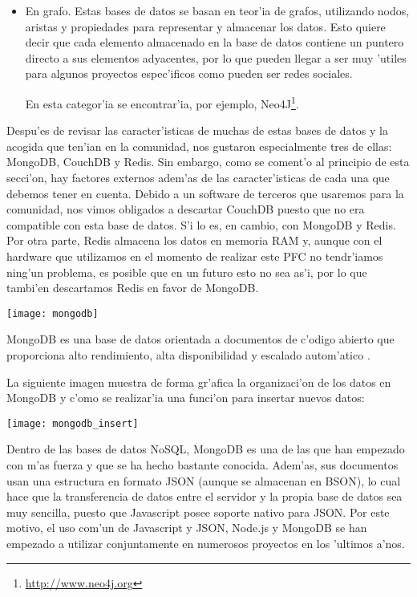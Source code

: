 \begin{itemize}
 Un ejemplo de base de datos Clave-valor es Redis\footnote{\url{http://redis.io}}.
 
 \item En grafo.
 Estas bases de datos se basan en teor'ia de grafos, utilizando nodos, aristas y propiedades para
 representar y almacenar los datos. Esto quiere decir que cada elemento almacenado en la base
 de datos contiene un puntero directo a sus elementos adyacentes, por lo que pueden llegar a
 ser muy 'utiles para algunos proyectos espec'ificos como pueden ser redes sociales.
 
 En esta categor'ia se encontrar'ia, por ejemplo, Neo4J\footnote{\url{http://www.neo4j.org}}.
 
\end{itemize}

Despu'es de revisar las caracter'isticas de muchas de estas bases de datos y la acogida que ten'ian en la
comunidad, nos gustaron especialmente tres
de ellas: MongoDB, CouchDB y Redis. Sin embargo, como se coment'o al principio de esta secci'on, hay factores
externos adem'as de las caracter'isticas de cada una que debemos tener en cuenta. Debido a un software de terceros
que usaremos para la comunidad, nos vimos obligados a descartar CouchDB puesto que no era compatible con esta base de datos.
S'i lo es, en cambio, con MongoDB y Redis. Por otra parte, Redis almacena los datos en memoria RAM y, aunque
con el hardware que utilizamos en el momento de realizar este PFC no tendr'iamos ning'un problema, es posible
que en un futuro esto no sea as'i, por lo que tambi'en descartamos Redis en favor de MongoDB.


\begin{center}
\texttt{[image: mongodb]}
\end{center}

MongoDB es una base de datos orientada a documentos de c'odigo abierto que proporciona alto rendimiento,
alta disponibilidad y escalado autom'atico \cite{mongodbmanual}.

La siguiente imagen muestra de forma gr'afica la organizaci'on de los datos en MongoDB y c'omo se realizar'ia
una funci'on para insertar nuevos datos\cite{mongodbmanual}:

\begin{center}
\texttt{[image: mongodb\_insert]}
\end{center}

Dentro de las bases de datos NoSQL, MongoDB es una de las que han empezado con m'as fuerza
y que se ha hecho bastante conocida. Adem'as, sus documentos usan una estructura en formato
JSON (aunque se almacenan en BSON), lo cual hace que la transferencia de datos entre el servidor
y la propia base de datos sea muy sencilla, puesto que Javascript posee soporte nativo para JSON.
Por este motivo, el uso com'un de Javascript y JSON, Node.js y MongoDB se han empezado a utilizar
conjuntamente en numerosos proyectos en los 'ultimos a'nos.

